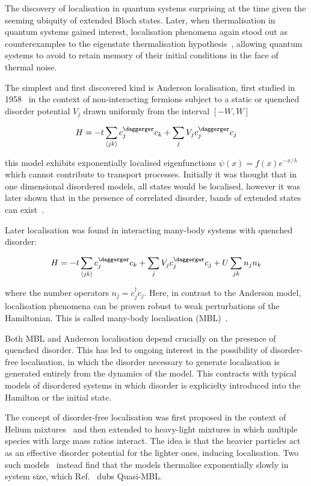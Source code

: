 The discovery of localisation in quantum systems surprising at the time given the seeming ubiquity of extended Bloch states. Later, when thermalisation in quantum systems gained interest, localisation phenomena again stood out as counterexamples to the eigenstate thermalisation hypothesis~\autocite{abaninRecentProgressManybody2017,srednickiChaosQuantumThermalization1994}, allowing quantum systems to avoid to retain memory of their initial conditions in the face of thermal noise.

The simplest and first discovered kind is Anderson localisation, first studied in 1958~\autocite{andersonAbsenceDiffusionCertain1958} in the context of non-interacting fermions subject to a static or quenched disorder potential \(V_j\) drawn uniformly from the interval \([-W,W]\)

\[
H = -t\sum_{\langle jk \rangle} c^\daggerger_j c_k + \sum_j V_j c_j^\daggerger c_j
\]

this model exhibits exponentially localised eigenfunctions \(\psi(x) = f(x) e^{-x/\lambda}\) which cannot contribute to transport processes. Initially it was thought that in one dimensional disordered models, all states would be localised, however it was later shown that in the presence of correlated disorder, bands of extended states can exist~\autocite{izrailevLocalizationMobilityEdge1999,croyAndersonLocalization1D2011,izrailevAnomalousLocalizationLowDimensional2012}.

Later localisation was found in interacting many-body systems with quenched disorder:

\[
H = -t\sum_{\langle jk \rangle} c^\daggerger_j c_k + \sum_j V_j c_j^\daggerger c_j + U\sum_{jk} n_j n_k
\]

where the number operators \(n_j = c^\dagger_j c_j\). Here, in contrast to the Anderson model, localisation phenomena can be proven robust to weak perturbations of the Hamiltonian. This is called many-body localisation (MBL)~\autocite{imbrieManyBodyLocalizationQuantum2016}.

Both MBL and Anderson localisation depend crucially on the presence of quenched disorder. This has led to ongoing interest in the possibility of disorder-free localisation, in which the disorder necessary to generate localisation is generated entirely from the dynamics of the model. This contracts with typical models of disordered systems in which disorder is explicielty introduced into the Hamilton or the initial state.

The concept of disorder-free localisation was first proposed in the context of Helium mixtures~\autocite{kagan1984localization} and then extended to heavy-light mixtures in which multiple species with large mass ratios interact. The idea is that the heavier particles act as an effective disorder potential for the lighter ones, inducing localisation. Two such models~\autocite{yaoQuasiManyBodyLocalizationTranslationInvariant2016,schiulazDynamicsManybodyLocalized2015} instead find that the models thermalise exponentially slowly in system size, which Ref.~\autocite{yaoQuasiManyBodyLocalizationTranslationInvariant2016} dubs Quasi-MBL.


